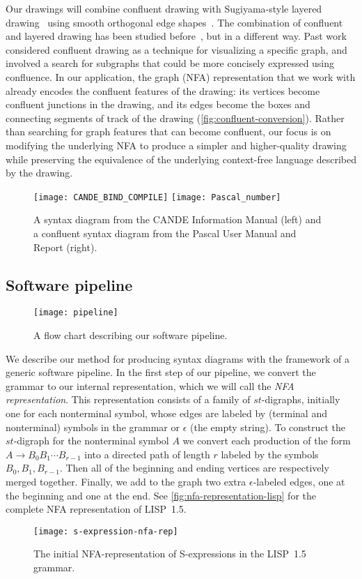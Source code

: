 \documentclass[10pt]{llncs}
\begin{document}
Our drawings will combine confluent drawing with Sugiyama-style layered drawing~\cite{SugTagSho-SMC-1981,BasMat-DGMM-01} using smooth orthogonal edge shapes~\cite{BekKauKob-JGAA-13}. The combination of confluent and layered drawing has been studied before~\cite{EppGooMen-GD-05}, but in a different way. Past work considered confluent drawing as a technique for visualizing a specific graph, and involved a search for subgraphs that could be more concisely expressed using confluence. In our application, the graph (NFA) representation that we work with already encodes the confluent features of the drawing: its vertices become confluent junctions in the drawing, and its edges become the boxes and connecting segments of track of the drawing (\autoref{fig:confluent-conversion}). Rather than searching for graph features that can become confluent, our focus is on modifying the underlying NFA to produce a simpler and higher-quality drawing while preserving the equivalence of the underlying context-free language described by the drawing.

\begin{figure}
\centering
\texttt{[image: CANDE\_BIND\_COMPILE]}
\hfill
\texttt{[image: Pascal\_number]}
\caption{A syntax diagram from the CANDE Information Manual (left) and a confluent syntax diagram from the Pascal User Manual and Report (right).}
\label{fig:s-expressions-syntax-diagram}
\end{figure}

\subsection{Software pipeline}
\begin{figure}[t]
\texttt{[image: pipeline]}
\caption{A flow chart describing our software pipeline.}
\end{figure}
We describe our method for producing syntax diagrams with the framework of a generic software pipeline. In the first step of our pipeline, we convert the grammar to our internal representation, which we will call the \emph{NFA representation}. This representation consists of a family of $st$-digraphs, initially one for each nonterminal symbol, whose edges are labeled by (terminal and nonterminal) symbols in the grammar or $\epsilon$ (the empty string). To construct the $st$-digraph for the nonterminal symbol $A$ we convert each production of the form $A \to B_0B_1\cdots B_{r-1}$ into a directed path of length $r$ labeled by the symbols $B_0, B_1, B_{r-1}$. Then all of the beginning and ending vertices are respectively merged together. Finally, we add to the graph two extra $\epsilon$-labeled edges, one at the beginning and one at the end. See \autoref{fig:nfa-representation-lisp} for the complete NFA representation of LISP~1.5.
\begin{figure}
\centering
\texttt{[image: s-expression-nfa-rep]}
\caption{The initial NFA-representation of S-expressions in the LISP~1.5 grammar.}
\label{fig:nfa-representation-lisp}
\end{figure}
\end{document}
